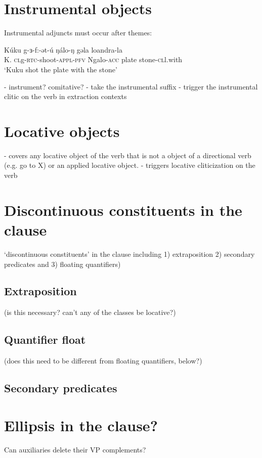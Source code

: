 \section{Instrumental objects}


Instrumental adjuncts must occur after themes:

\ea \ea \gll Kúku g-ɜ-f:-ət-ú ŋálo-ŋ gəla loandra-la\\
K. \textsc{cl}g-\textsc{rtc}-shoot-\textsc{appl-pfv} Ngalo-\textsc{acc} plate stone-\textsc{cl}l.with\\ 
\glt `Kuku shot the plate with the stone'
\z 
\z 

- instrument? comitative? 
- take the instrumental suffix
- trigger the instrumental clitic on the verb in extraction contexts

\section{Locative objects}\label{sec:ch12:locobj}

- covers any locative object of the verb that is not a object of a directional verb (e.g. go to X) or an applied locative object.
- triggers locative cliticization on the verb


\section{Discontinuous constituents in the clause}

`discontinuous constituents' in the clause including 1) extraposition 2) secondary predicates and 3) floating quantifiers)

\subsection{Extraposition}

(is this necessary? can't any of the classes be locative?)

\subsection{Quantifier float}

(does this need to be different from floating quantifiers, below?)

\subsection{Secondary predicates}


\section{Ellipsis in the clause?}

Can auxiliaries delete their VP complements?